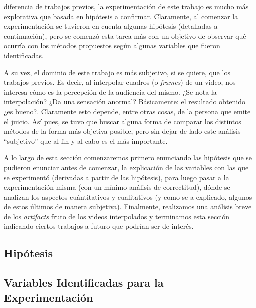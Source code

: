  diferencia de trabajos previos, la experimentaci\'on de este
trabajo es mucho m\'as explorativa que basada en hip\'otesis a confirmar.
Claramente, al comenzar la experimentaci\'on se tuvieron en cuenta algunas hip\'otesis
(detalladas a continuaci\'on), pero se comenz\'o esta tarea m\'as con un
objetivo de observar qué ocurría con los m\'etodos propuestos seg\'un algunas
variables que fueron identificadas.

\par A su vez, el dominio de este trabajo es m\'as subjetivo, si se quiere, que
los trabajos previos. Es decir, al interpolar cuadros (o \emph{frames}) de un
video, nos interesa cómo es la percepci\'on de la audiencia del mismo. ¿Se nota
la interpolaci\'on? ¿Da una sensaci\'on anormal?
B\'asicamente: el resultado obtenido ¿es bueno?. Claramente esto depende, entre otras cosas, de la persona que emite el juicio.
As\'i pues, se tuvo que buscar alguna forma de comparar los distintos m\'etodos
de la forma m\'as objetiva posible, pero sin dejar de lado este
an\'alisis ``subjetivo'' que al fin y al cabo es el m\'as importante.

\par A lo largo de esta secci\'on comenzaremos primero enunciando las
hip\'otesis que se pudieron enunciar antes de comenzar, la explicaci\'on de las
variables con las que se experiment\'o (derivadas a partir de las hip\'otesis),
para luego pasar a la experimentaci\'on misma (con un m\'inimo an\'alisis de
correctitud), d\'onde se analizan los aspectos cu\'antitativos y cualitativos
(y como se a explicado, algunos de estos \'ultimos de manera subjetiva).
Finalmente, realizamos una an\'alisis breve de los \emph{artifacts} fruto de
los videos interpolados y terminamos esta secci\'on indicando ciertos trabajos
a futuro que podr\'ian ser de inter\'es.

\subsection{Hip\'otesis}


\subsection{Variables Identificadas para la Experimentaci\'on}


